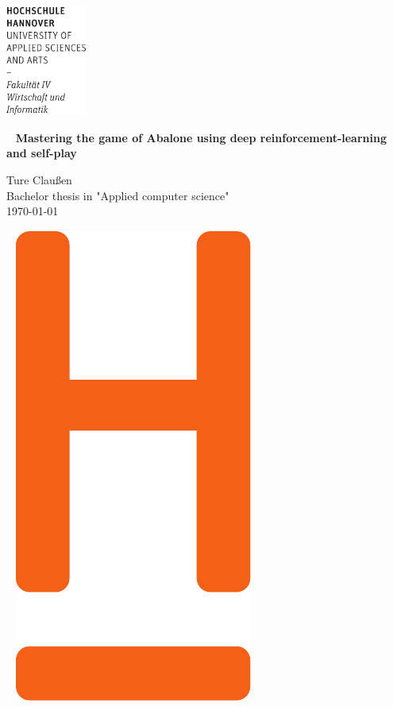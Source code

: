 \documentclass[fontsize=12pt,paper=a4,twoside,parskip=half-,headsepline,headinclude]{scrreprt}
\begin{document}
\thispagestyle{empty}
\includegraphics[width=0.2\textwidth]{../lib/Wortmarke_WI_schwarz}

{  ~ \sffamily
  \vfill
  {\Huge\bfseries Mastering the game of Abalone using deep reinforcement-learning and self-play}
  \bigskip

  {\Large
    Ture Claußen \\[2ex]
    Bachelor thesis in "Applied computer science"
    \\[5ex]
    \today }
}
\vfill

~ \hfill
\includegraphics[height=0.3\paperheight]{../lib/H_WI_Pantone1665}

\vspace*{-3cm}
\end{document}
